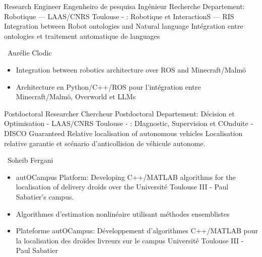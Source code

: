 \cventry{\jun\ 2024 \newline \nov\ 2024\newline}
{
  \ml
  {Research Engineer}
  {Engenheiro de pesquisa}
  {Ingénieur Recherche}%
}
{\newline Departement: Robotique --- LAAS/CNRS}
{\newline Toulouse - \france
\newline{}: Robotique et InteractionS --- RIS}%
{\newline
  \ml
  {Integration between Robot ontologies and Natural language}
  {}
  {Intégration entre ontologies et traitement automatique de languages}
}
{
  \supervisor\ Aurélie Clodic
  \ml
  {
    \begin{itemize}
      \item Integration between robotics architecture over ROS and Minecraft/Malmö
    \end{itemize}
  }
  {}
  {\begin{itemize}
    \item Architecture en Python/C++/ROS pour l'intégration entre Minecraft/Malmö,
           Overworld et LLMs
  \end{itemize}
  }
}

\cventry{\may\ 2023 \newline \may\ 2024\newline}
{
  \ml
  {Postdoctoral Researcher}
  {}
  {Chercheur Postdoctoral}%
}
{\newline Departement: Décision et Optimisation - LAAS/CNRS}
{\newline Toulouse - \france
\newline{}: DIagnostic, Supervision et COnduite - DISCO}
{\newline
  \ml
  {Guaranteed Relative localisation of autonomous vehicles}
  {}
  {Localisation relative garantie et scénario d'anticollision de véhicule autonome}.
}
{
  \supervisor\ Soheib Fergani
  \ml
  {
    \begin{itemize}
      \item autOCampus Platform: Developing C++/MATLAB algorithms for the localisation of delivery droïds over the Université Toulouse III - Paul Sabatier's campus.
    \end{itemize}
  }
  {}
  {\begin{itemize}
    \item Algorithmes d'estimation nonlinéaire utilisant méthodes ensemblistes
    \item Plateforme autOCampus: Développement d'algorithmes C++/MATLAB pour la localisation des droïdes livreurs sur le campus Université Toulouse III - Paul Sabatier
  \end{itemize}
  }
}

